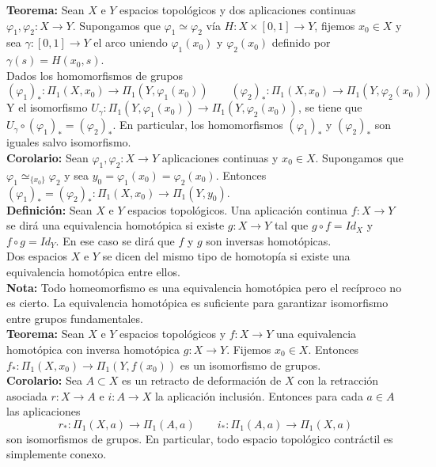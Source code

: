 \documentclass{article}
\begin{document}
\textbf{Teorema:} Sean $X$ e $Y$ espacios topológicos y dos aplicaciones continuas $\varphi_1,\varphi_2:X\rightarrow Y$. Supongamos que $\varphi_1\simeq\varphi_2$ vía $H:X\times [0,1]\rightarrow Y$, fijemos $x_0\in X$ y sea $\gamma:[0,1]\rightarrow Y$ el arco uniendo $\varphi_1(x_0)$ y $\varphi_2(x_0)$ definido por $\gamma(s)=H(x_0,s)$. \\

Dados los homomorfismos de grupos
\begin{equation*}
(\varphi_1)_*:\Pi_1(X,x_0)\rightarrow \Pi_1(Y,\varphi_1(x_0))\qquad (\varphi_2)_*:\Pi_1(X,x_0)\rightarrow \Pi_1(Y,\varphi_2(x_0))
\end{equation*}
Y el isomorfismo $U_\gamma:\Pi_1(Y,\varphi_1(x_0))\rightarrow \Pi_1(Y,\varphi_2(x_0))$, se tiene que $U_\gamma\circ (\varphi_1)_*=(\varphi_2)_*$. En particular, los homomorfismos $(\varphi_1)_*$ y $(\varphi_2)_*$ son iguales salvo isomorfismo. \\

\textbf{Corolario:} Sean $\varphi_1,\varphi_2:X\rightarrow Y$ aplicaciones continuas y $x_0\in X$. Supongamos que $\varphi_1\simeq_{\{x_0\}}\varphi_2$ y sea $y_0=\varphi_1(x_0)=\varphi_2(x_0)$. Entonces $(\varphi_1)_*=(\varphi_2)_*:\Pi_1(X,x_0)\rightarrow \Pi_1(Y,y_0)$.\\

\textbf{Definición:} Sean $X$ e $Y$ espacios topológicos. Una aplicación continua $f:X\rightarrow Y$ se dirá una equivalencia homotópica si existe $g:X\rightarrow Y$ tal que $g\circ f=Id_X$ y $f\circ g=Id_Y$. En ese caso se dirá que $f$ y $g$ son inversas homotópicas. \\

Dos espacios $X$ e $Y$ se dicen del mismo tipo de homotopía si existe una equivalencia homotópica entre ellos. \\

\textbf{Nota:} Todo homeomorfismo es una equivalencia homotópica pero el recíproco no es cierto. La equivalencia homotópica es suficiente para garantizar isomorfismo entre grupos fundamentales. \\

\textbf{Teorema:} Sean $X$ e $Y$ espacios topológicos y $f:X\rightarrow Y$ una equivalencia homotópica con inversa homotópica $g:X\rightarrow Y$. Fijemos $x_0\in X$. Entonces $f_*:\Pi_1(X,x_0)\rightarrow \Pi_1(Y,f(x_0))$ es un isomorfismo de grupos. \\

\textbf{Corolario:} Sea $A\subset X$ es un retracto de deformación de $X$ con la retracción asociada $r:X\rightarrow A$ e $i:A\rightarrow X$ la aplicación inclusión. Entonces para cada $a\in A$ las aplicaciones 
\begin{equation*}
r_*:\Pi_1(X,a)\rightarrow \Pi_1(A,a)\qquad i_*:\Pi_1(A,a)\rightarrow \Pi_1(X,a)
\end{equation*}
son isomorfismos de grupos. En particular, todo espacio topológico contráctil es simplemente conexo. \\
\end{document}
